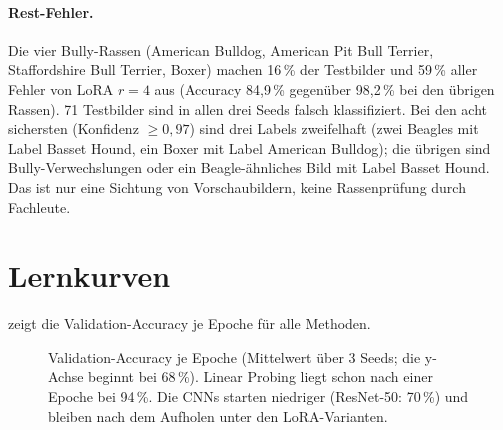 \paragraph{Rest-Fehler.} Die vier Bully-Rassen (American Bulldog, American Pit Bull Terrier,
Staffordshire Bull Terrier, Boxer) machen 16\,\% der Testbilder und 59\,\% aller Fehler von LoRA $r=4$
aus (Accuracy 84,9\,\% gegenüber 98,2\,\% bei den übrigen Rassen). 71 Testbilder sind in allen drei
Seeds falsch klassifiziert. Bei den acht sichersten (Konfidenz $\geq0{,}97$) sind drei Labels zweifelhaft
(zwei Beagles mit Label Basset Hound, ein Boxer mit Label American Bulldog); die übrigen sind
Bully-Verwechslungen oder ein Beagle-ähnliches Bild mit Label Basset Hound. Das ist nur eine Sichtung von
Vorschaubildern, keine Rassenprüfung durch Fachleute.


\section{Lernkurven}
\label{sec:curves}
 zeigt die Validation-Accuracy je Epoche für alle Methoden.

\begin{figure}[t]
  \centering
  \caption{Validation-Accuracy je Epoche (Mittelwert über 3 Seeds; die y-Achse beginnt bei 68\,\%). Linear
  Probing liegt schon nach einer Epoche bei 94\,\%. Die CNNs starten niedriger (ResNet-50: 70\,\%) und
  bleiben nach dem Aufholen unter den LoRA-Varianten.}
  \label{fig:curves}
\end{figure}

